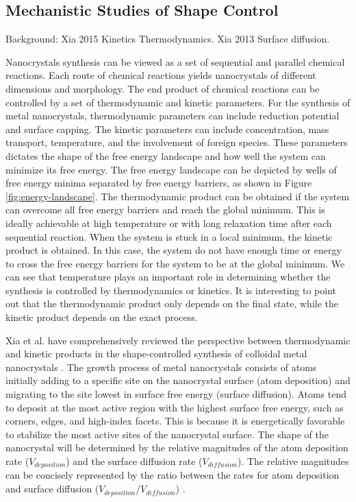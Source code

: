 \subsection{Mechanistic Studies of Shape Control}

Background: Xia 2015 Kinetics Thermodynamics. Xia 2013 Surface diffusion.

Nanocrystals synthesis can be viewed as a set of sequential and parallel chemical reactions.
Each route of chemical reactions yields nanocrystals of different dimensions and morphology.
The end product of chemical reactions can be controlled by a set of thermodynamic and kinetic parameters.
For the synthesis of metal nanocrystals, thermodynamic parameters can include reduction potential and surface capping.
The kinetic parameters can include concentration, mass transport, temperature, and the involvement of foreign species.
These parameters dictates the shape of the free energy landscape and how well the system can minimize its free energy.
The free energy landscape can be depicted by wells of free energy minima separated by free energy barriers, as shown in Figure \ref{fig:energy-landscape}.
The thermodynamic product can be obtained if the system can overcome all free energy barriers and reach the global minimum.
This is ideally achievable at high temperature or with long relaxation time after each sequential reaction.
When the system is stuck in a local minimum, the kinetic product is obtained.
In this case, the system do not have enough time or energy to cross the free energy barriers for the system to be at the global minimum.
We can see that temperature plays an important role in determining whether the synthesis is controlled by thermodynamics or kinetics.
It is interesting to point out that the thermodynamic product only depends on the final state, while the kinetic product depends on the exact process.

Xia et al. have comprehensively reviewed the perspective between thermodynamic and kinetic products in the shape-controlled synthesis of colloidal metal nanocrystals \cite{Xia_2015}.
The growth process of metal nanocrystals consists of atoms initially adding to a specific site on the nanocrystal surface (atom deposition) and migrating to the site lowest in surface free energy (surface diffusion).
Atoms tend to deposit at the most active region with the highest surface free energy, such as corners, edges, and high-index facets.
This is because it is energetically favorable to stabilize the most active sites of the nanocrystal surface.
The shape of the nanocrystal will be determined by the relative magnitudes of the atom deposition rate ($V_{deposition}$) and the surface diffusion rate ($V_{diffusion}$).
The relative magnitudes can be concisely represented by the ratio between the rates for atom deposition and surface diffusion ($V_{deposition}/V_{diffusion}$) \cite{Xia_2013}.

